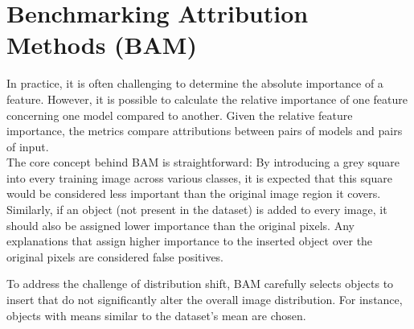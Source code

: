 \section{Benchmarking Attribution Methods (BAM) \cite{yang2019benchmarking}}

In practice, it is often challenging to determine the absolute importance of a feature. However, it is possible to calculate the relative importance of one feature concerning one model compared to another. Given the relative feature importance, the metrics compare attributions between pairs of models and pairs of input.\\

The core concept behind BAM is straightforward: By introducing a grey square into every training image across various classes, it is expected that this square would be considered less important than the original image region it covers. Similarly, if an object (not present in the dataset) is added to every image, it should also be assigned lower importance than the original pixels. Any explanations that assign higher importance to the inserted object over the original pixels are considered false positives.

To address the challenge of distribution shift, BAM carefully selects objects to insert that do not significantly alter the overall image distribution. For instance, objects with means similar to the dataset's mean are chosen. 

